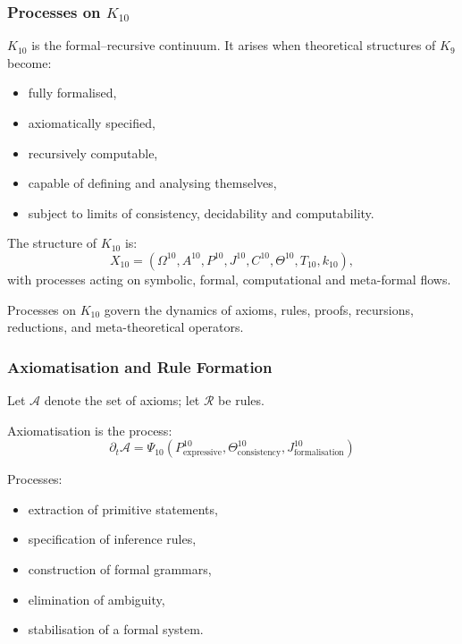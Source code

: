

\subsubsection{Processes on $K_{10}$}
\label{sec:processes-k10}

$K_{10}$ is the formal–recursive continuum.
It arises when theoretical structures of $K_{9}$ become:
\begin{itemize}
    \item fully formalised,
    \item axiomatically specified,
    \item recursively computable,
    \item capable of defining and analysing themselves,
    \item subject to limits of consistency, decidability and computability.
\end{itemize}

The structure of $K_{10}$ is:
\[
X_{10} = (\Omega^{10}, A^{10}, P^{10}, J^{10}, C^{10},
          \Theta^{10}, T_{10}, k_{10}),
\]
with processes acting on symbolic, formal, computational and meta-formal flows.

Processes on $K_{10}$ govern the dynamics of axioms, rules, proofs,
recursions, reductions, and meta-theoretical operators.

\subsubsection{Axiomatisation and Rule Formation}

Let $\mathcal{A}$ denote the set of axioms; let $\mathcal{R}$ be rules.

Axiomatisation is the process:
\[
\partial_t \mathcal{A}
= \Psi_{10}(P^{10}_{\text{expressive}},
            \Theta^{10}_{\text{consistency}},
            J^{10}_{\text{formalisation}})
\]

Processes:
\begin{itemize}
    \item extraction of primitive statements,
    \item specification of inference rules,
    \item construction of formal grammars,
    \item elimination of ambiguity,
    \item stabilisation of a formal system.
\end{itemize}

